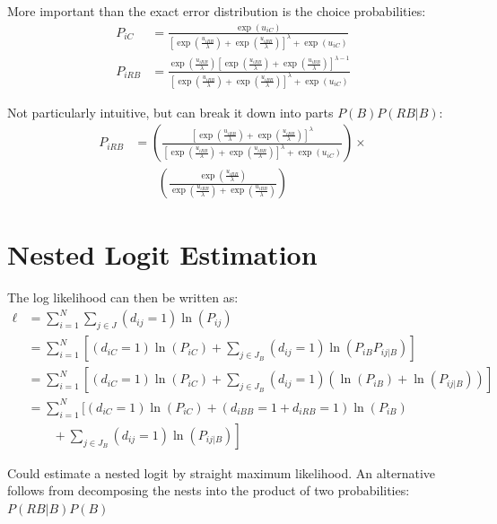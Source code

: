 \documentclass[11pt]{article}
\begin{document}
More important than the exact error distribution is the choice probabilities:
\begin{align*}
P_{iC}&=\frac{\exp(u_{iC})}{\left[\exp\left(\frac{u_{iRB}}{\lambda}\right)+\exp\left(\frac{u_{iBB}}{\lambda}\right)\right]^{\lambda}+\exp(u_{iC})}\\
P_{iRB}&=\frac{\exp\left(\frac{u_{iRB}}{\lambda}\right)\left[\exp\left(\frac{u_{iRB}}{\lambda}\right)+\exp\left(\frac{u_{iBB}}{\lambda}\right)\right]^{\lambda-1}}{\left[\exp\left(\frac{u_{iRB}}{\lambda}\right)+\exp\left(\frac{u_{iBB}}{\lambda}\right)\right]^{\lambda}+\exp(u_{iC})}
\end{align*}


Not particularly intuitive, but can break it down into parts \(P(B)P(RB|B)\):
\begin{align}
P_{iRB}&=\left(\frac{\left[\exp\left(\frac{u_{iRB}}{\lambda}\right)+\exp\left(\frac{u_{iBB}}{\lambda}\right)\right]^{\lambda}}{\left[\exp\left(\frac{u_{iRB}}{\lambda}\right)+\exp\left(\frac{u_{iBB}}{\lambda}\right)\right]^{\lambda}+\exp(u_{iC})}\right)\times\label{eq:pbus}\\
&\phantom{\times\times}\left(\frac{\exp\left(\frac{u_{iRB}}{\lambda}\right)}{\exp\left(\frac{u_{iRB}}{\lambda}\right)+\exp\left(\frac{u_{iBB}}{\lambda}\right)}\right)\nonumber
\end{align}

\section{Nested Logit Estimation}
\label{sec:org06bb8d2}

The log likelihood can then be written as:
\begin{align*}
\ell&=\sum_{i=1}^N\sum_{j\in J}(d_{ij}=1)\ln(P_{ij})\\
&= \sum_{i=1}^N\left[(d_{iC}=1)\ln(P_{iC})+\sum_{j\in J_B}(d_{ij}=1)\ln(P_{iB}P_{ij|B})\right]\\
&=\sum_{i=1}^N\left[(d_{iC}=1)\ln(P_{iC})+\sum_{j\in J_B}(d_{ij}=1)(\ln(P_{iB})+\ln(P_{ij|B}))\right]\\
&=\sum_{i=1}^N\Bigg[(d_{iC}=1)\ln(P_{iC})+(d_{iBB}=1+d_{iRB}=1)\ln(P_{iB})\\
&\qquad+\left.\sum_{j\in J_B}(d_{ij}=1)\ln(P_{ij|B})\right]
\end{align*}

Could estimate a nested logit by straight maximum likelihood.  An alternative follows from decomposing the nests into the product of two probabilities: \(P(RB|B)P(B)\)
\end{document}
